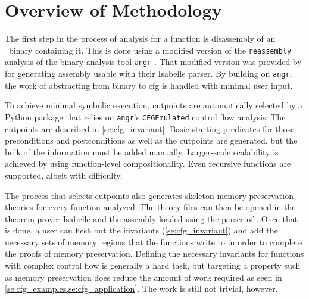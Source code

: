 \section{Overview of Methodology}\label{se:cfg_overview}
The first step in the process of analysis for a function
is disassembly of an \arch\ binary containing it.
This is done using a modified version of the \lstinline|reassembly| analysis
\autocite{wang2017ramblr} of the binary analysis tool \texttt{angr} \autocite{shoshitaishvili2016state}.%
That modified version was provided by \textcite{roessle2019}
for generating assembly usable with their Isabelle parser.%
By building on \texttt{angr},
the work of abstracting from binary to \ac{cfg} is handled with minimal user input.

To achieve minimal symbolic execution, cutpoints%
are automatically selected by a Python package that relies on
\texttt{angr}'s \lstinline|CFGEmulated| control flow analysis.%
The cutpoints are described in \cref{se:cfg_invariant}.
Basic starting predicates for those preconditions and postconditions%
%
as well as the cutpoints are generated,
but the bulk of the information must be added manually.
Larger-scale scalability is achieved by using function-level compositionality.
Even recursive functions are supported, albeit with difficulty.%

The process that selects cutpoints%
also generates skeleton memory preservation theories for every function analyzed.
The theory files can then be opened in the theorem prover Isabelle
and the assembly loaded using the parser of \textcite{roessle2019}.
Once that is done, a user can flesh out the invariants (\cref{se:cfg_invariant})
and add the necessary sets of memory regions that the functions write to
in order to complete the proofs of memory preservation.
Defining the necessary invariants for functions with complex control flow
is generally a hard task, but targeting a property such as memory preservation
does reduce the amount of work required
as seen in \cref{se:cfg_examples,se:cfg_application}.
The work is still not trivial, however.

